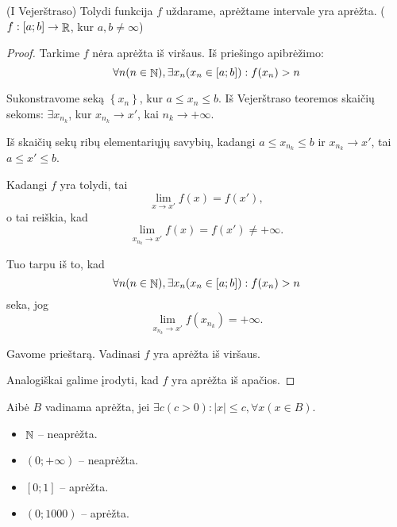\begin{prop}
  (I Vejerštraso) Tolydi funkcija $f$ uždarame, aprėžtame intervale yra
  aprėžta. ($f : [a;b] \to \mathop{\mathbb{R}}$, kur $a, b \neq \infty$)

  \begin{proof}
    Tarkime $f$ nėra aprėžta iš viršaus. Iš priešingo apibrėžimo:
    \begin{equation*}
      \forall n (n \in \mathop{\mathbb{N}}), \exists x_{n} (x_{n} \in [a;b]) :
        f(x_{n}) > n
    \end{equation*}

    Sukonstravome seką $\left\{ x_{n} \right\}$, kur 
    $a \leq x_{n} \leq b$. Iš Vejerštraso teoremos skaičių sekoms:
    $ \exists x_{n_{k}}$, kur $x_{n_{k}} \to x'$, 
    kai $n_{k} \to +\infty$.

    Iš skaičių sekų ribų elementariųjų savybių, kadangi 
    $a \leq x_{n_{k}} \leq b$ ir $x_{n_{k}} \to x'$, tai 
    $a \leq x' \leq b$.

    Kadangi $f$ yra tolydi, tai 
    \begin{equation*}
      \lim_{x \to x'} f(x) = f(x'),
    \end{equation*}
    o tai reiškia, kad
    \begin{equation*}
      \lim_{x_{n_{k}} \to x'} f(x) = f(x') \neq +\infty.
    \end{equation*}

    Tuo tarpu iš to, kad
    \begin{equation*}
      \forall n (n \in \mathop{\mathbb{N}}), \exists x_{n} (x_{n} \in [a;b]) :
        f(x_{n}) > n
    \end{equation*}
    seka, jog
    \begin{equation*}
      \lim_{x_{n_{k}} \to x'} f(x_{n_{k}}) = +\infty.
    \end{equation*}

    Gavome prieštarą. Vadinasi $f$ yra aprėžta iš viršaus. 

    Analogiškai galime įrodyti, kad $f$ yra aprėžta iš apačios.
  \end{proof}

\end{prop}

\begin{exmp}
  Aibė $B$ vadinama aprėžta, jei 
  $\exists c (c > 0) : |x| \leq c, \forall x (x \in B)$.
  \begin{itemize}
    \item $\mathop{\mathbb{N}}$ – neaprėžta.
    \item $(0; +\infty)$ – neaprėžta.
    \item $[0; 1]$ – aprėžta.
    \item $(0; 1000)$ – aprėžta.
  \end{itemize}
\end{exmp}

